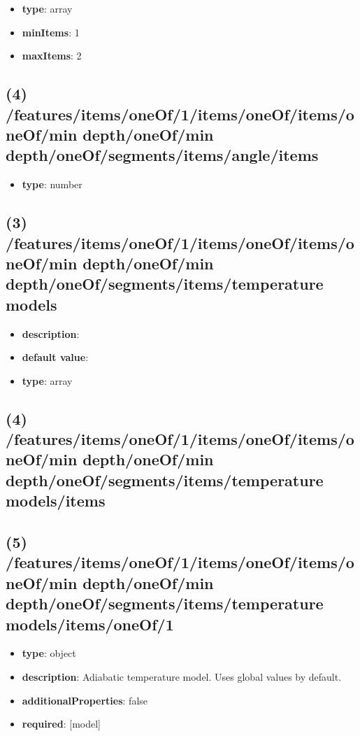 \begin{itemize}[leftmargin=3em]\item {\bf type}: array
\item {\bf minItems}: 1
\item {\bf maxItems}: 2
\end{itemize}\subsection{(4) /features/items/oneOf/1/items/oneOf/items/oneOf/min depth/oneOf/min depth/oneOf/segments/items/angle/items}
\begin{itemize}[leftmargin=4em]\item {\bf type}: number
\end{itemize}\subsection{(3) /features/items/oneOf/1/items/oneOf/items/oneOf/min depth/oneOf/min depth/oneOf/segments/items/temperature models}
\begin{itemize}[leftmargin=3em]\item {\bf description}: 
\item {\bf default value}: 
\item {\bf type}: array
\end{itemize}\subsection{(4) /features/items/oneOf/1/items/oneOf/items/oneOf/min depth/oneOf/min depth/oneOf/segments/items/temperature models/items}

\subsection{(5) /features/items/oneOf/1/items/oneOf/items/oneOf/min depth/oneOf/min depth/oneOf/segments/items/temperature models/items/oneOf/1}
\begin{itemize}[leftmargin=5em]\item {\bf type}: object
\item {\bf description}: Adiabatic temperature model. Uses global values by default.
\item {\bf additionalProperties}: false
\item {\bf required}: [model]\end{itemize}
